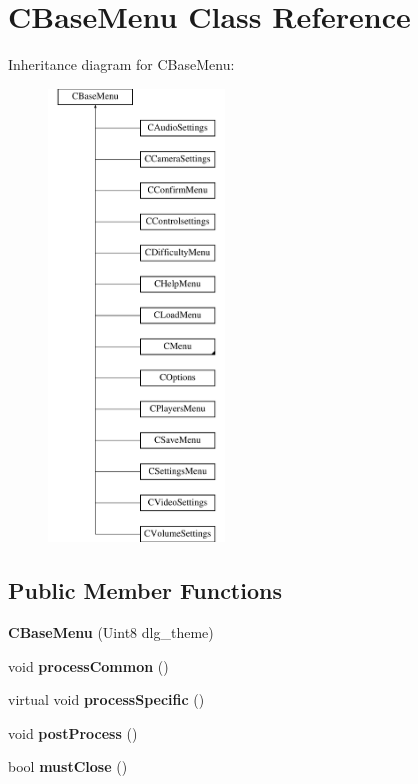 \hypertarget{class_c_base_menu}{
\section{CBaseMenu Class Reference}
\label{class_c_base_menu}
}
Inheritance diagram for CBaseMenu:\begin{figure}[H]
\begin{center}
\leavevmode
\includegraphics[height=12cm]{class_c_base_menu}
\end{center}
\end{figure}
\subsection*{Public Member Functions}
\begin{DoxyCompactItemize}
\item 
\hypertarget{class_c_base_menu_a5c69164461fd31cdaad0a992960a2231}{
{\bfseries CBaseMenu} (Uint8 dlg\_\-theme)}
\label{class_c_base_menu_a5c69164461fd31cdaad0a992960a2231}

\item 
\hypertarget{class_c_base_menu_a8bb71cd9b56e6a77d4f9ca5dbc200d28}{
void {\bfseries processCommon} ()}
\label{class_c_base_menu_a8bb71cd9b56e6a77d4f9ca5dbc200d28}

\item 
\hypertarget{class_c_base_menu_a751dc8b1efab035676ba46629753b5b8}{
virtual void {\bfseries processSpecific} ()}
\label{class_c_base_menu_a751dc8b1efab035676ba46629753b5b8}

\item 
\hypertarget{class_c_base_menu_a68784421ca02e07be18560a6847c8ac0}{
void {\bfseries postProcess} ()}
\label{class_c_base_menu_a68784421ca02e07be18560a6847c8ac0}

\item 
\hypertarget{class_c_base_menu_a47cc8d381b94dfdb90e9e7ff65904d16}{
bool {\bfseries mustClose} ()}
\label{class_c_base_menu_a47cc8d381b94dfdb90e9e7ff65904d16}

\end{DoxyCompactItemize}
